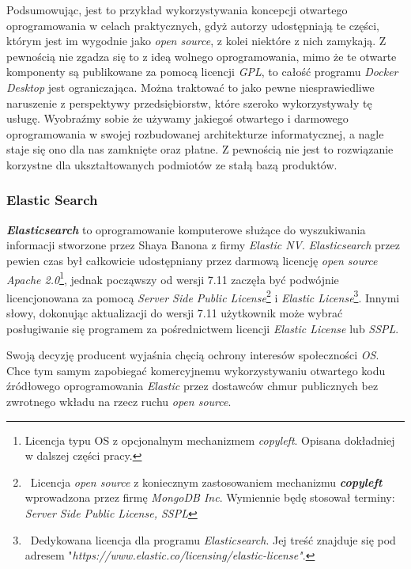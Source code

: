 \documentclass{article}
\begin{document}
Podsumowując, jest to przykład wykorzystywania koncepcji otwartego oprogramowania w celach praktycznych, gdyż autorzy udostępniają te części, którym jest im wygodnie jako \emph{open source}, z kolei niektóre z nich zamykają. Z pewnością nie zgadza się to z ideą wolnego oprogramowania, mimo że te otwarte komponenty są publikowane za pomocą licencji \emph{GPL}, to całość programu \emph{Docker Desktop} jest ograniczająca\cite{docker.licensing}. Można traktować to jako pewne niesprawiedliwe naruszenie z perspektywy przedsiębiorstw, które szeroko wykorzystywały tę usługę. Wyobraźmy sobie że używamy jakiegoś otwartego i darmowego oprogramowania w swojej rozbudowanej architekturze informatycznej, a nagle staje się ono dla nas zamknięte oraz płatne. Z pewnością nie jest to rozwiązanie korzystne dla ukształtowanych podmiotów ze stałą bazą produktów.

\subsubsection{Elastic Search}

\hspace{4mm} \textbf{\emph{Elasticsearch}} to oprogramowanie komputerowe służące do wyszukiwania informacji stworzone przez Shaya Banona z firmy \emph{Elastic NV}\cite{elastic.def}. \emph{Elasticsearch} przez pewien czas był całkowicie udostępniany przez darmową licencję \emph{open source} \emph{Apache 2.0}\footnote{Licencja typu OS z opcjonalnym mechanizmem \emph{copyleft}. Opisana dokładniej w dalszej części pracy.}, jednak począwszy od wersji 7.11 zaczęła być podwójnie licencjonowana za pomocą \emph{Server Side Public License}\footnote{\, Licencja \emph{open source} z koniecznym zastosowaniem mechanizmu \textbf{\emph{copyleft}} wprowadzona przez firmę \emph{MongoDB Inc}\cite{sspl.wiki}. Wymiennie będę stosował terminy: \emph{Server Side Public License, SSPL}} i \emph{Elastic License}\footnote{\, Dedykowana licencja dla programu \emph{Elasticsearch}. Jej treść znajduje się pod adresem "\emph{https://www.elastic.co/licensing/elastic-license"}\cite{elastic.license}.}. Innymi słowy, dokonując aktualizacji do wersji 7.11 użytkownik może wybrać posługiwanie się programem za pośrednictwem licencji \emph{Elastic License} lub \emph{SSPL}\cite{linux.polska}. 

Swoją decyzję producent wyjaśnia chęcią ochrony interesów społeczności \emph{OS}. Chce tym samym zapobiegać komercyjnemu wykorzystywaniu otwartego kodu źródłowego oprogramowania \emph{Elastic} przez dostawców chmur publicznych bez zwrotnego wkładu na rzecz ruchu \emph{open source}\cite{linux.polska}.
\end{document}
